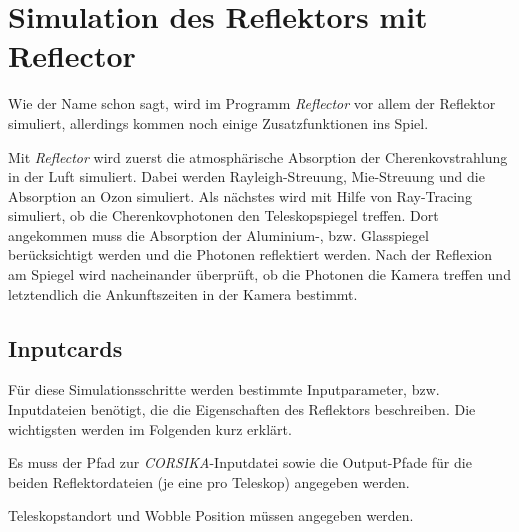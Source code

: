 % 

\section{Simulation des Reflektors mit Reflector}
Wie der Name schon sagt, wird im Programm \textit{Reflector} vor allem der Reflektor simuliert, allerdings kommen noch einige Zusatzfunktionen ins Spiel.

Mit \textit{Reflector} wird zuerst die atmosphärische Absorption der Cherenkovstrahlung in der Luft simuliert. 
Dabei werden Rayleigh-Streuung, Mie-Streuung und die Absorption an Ozon simuliert.
Als nächstes wird mit Hilfe von Ray-Tracing simuliert, ob die Cherenkovphotonen den Teleskopspiegel treffen.
Dort angekommen muss die Absorption der Aluminium-, bzw. Glasspiegel berücksichtigt werden und die Photonen reflektiert werden.
Nach der Reflexion am Spiegel wird nacheinander überprüft, ob die Photonen die Kamera treffen und letztendlich die Ankunftszeiten in der Kamera bestimmt.

\subsection{Inputcards}
Für diese Simulationsschritte werden bestimmte Inputparameter, bzw. Inputdateien benötigt, die die Eigenschaften des Reflektors beschreiben.
Die wichtigsten werden im Folgenden kurz erklärt.

Es muss der Pfad zur \textit{CORSIKA}-Inputdatei sowie die Output-Pfade für die beiden Reflektordateien (je eine pro Teleskop) angegeben werden.

Teleskopstandort und Wobble Position müssen angegeben werden.

